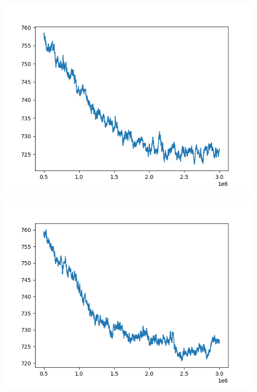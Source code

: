 \documentclass{article}
\begin{document}
\begin{enumerate}[label=\arabic*.]
        \begin{minipage}{0.4\linewidth}
            \includegraphics[width=\linewidth]{../starter_code/figs/sgd_k30.png}
        \end{minipage}\hfill
        \begin{minipage}{0.4\linewidth}
            \includegraphics[width=\linewidth]{../starter_code/figs/sgd_k40.png}
        \end{minipage}\hfill
        \begin{minipage}{0.4\linewidth}

\end{minipage}
\end{enumerate}
\end{document}
